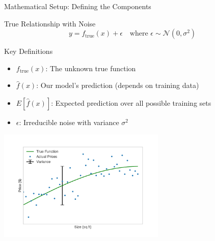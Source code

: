 \documentclass[10pt]{beamer}
\newcommand{\fitpic}[1]{\begin{adjustbox}{max width=\linewidth, max totalheight=0.78\textheight}#1\end{adjustbox}}
\begin{document}
\begin{frame}{Mathematical Setup: Defining the Components}
\begin{definitionbox}{True Relationship with Noise}
$$y = f_{\text{true}}(x) + \epsilon \quad \text{where } \epsilon \sim \mathcal{N}(0, \sigma^2)$$
\end{definitionbox}

\begin{keypointsbox}{Key Definitions}
\begin{itemize}
\item $f_{\text{true}}(x)$: The unknown true function
\item $\hat{f}(x)$: Our model's prediction (depends on training data)
\item $E[\hat{f}(x)]$: Expected prediction over all possible training sets
\item $\epsilon$: Irreducible noise with variance $\sigma^2$
\end{itemize}
\end{keypointsbox}

\begin{center}
\fitpic{\includegraphics[width=0.6\textwidth]{../assets/bias-variance/figures/data_var.pdf}}
\end{center}
\end{frame}
\end{document}
